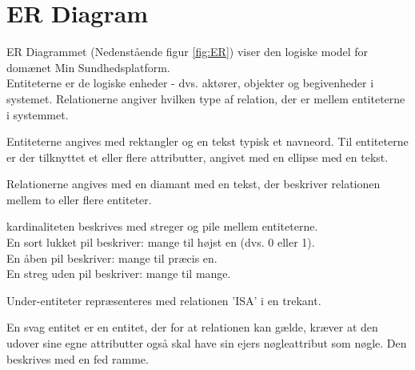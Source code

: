 \section{ER Diagram}
ER Diagrammet (Nedenstående figur \ref{fig:ER}) viser den logiske model for domænet Min Sundhedsplatform. \\
Entiteterne er de logiske enheder - dvs. aktører, objekter og begivenheder i systemet. 
Relationerne angiver hvilken type af relation, der er mellem entiteterne i systemmet.

Entiteterne angives med rektangler og en tekst typisk et navneord. Til entiteterne er der tilknyttet et eller flere attributter, angivet med en ellipse med en tekst.

Relationerne angives med en diamant med en  tekst, der beskriver relationen mellem to eller flere entiteter.

kardinaliteten beskrives med streger og pile mellem entiteterne. \\ 
En sort lukket pil beskriver: mange til højst en (dvs. 0 eller 1).\\
En åben pil beskriver: mange til præcis en.\\
En streg uden pil beskriver: mange til mange.

Under-entiteter repræsenteres med relationen 'ISA' i en trekant.

En svag entitet er en entitet, der for at relationen kan gælde, kræver at den udover sine egne attributter også skal have sin ejers nøgleattribut som nøgle. Den beskrives med en fed ramme.

